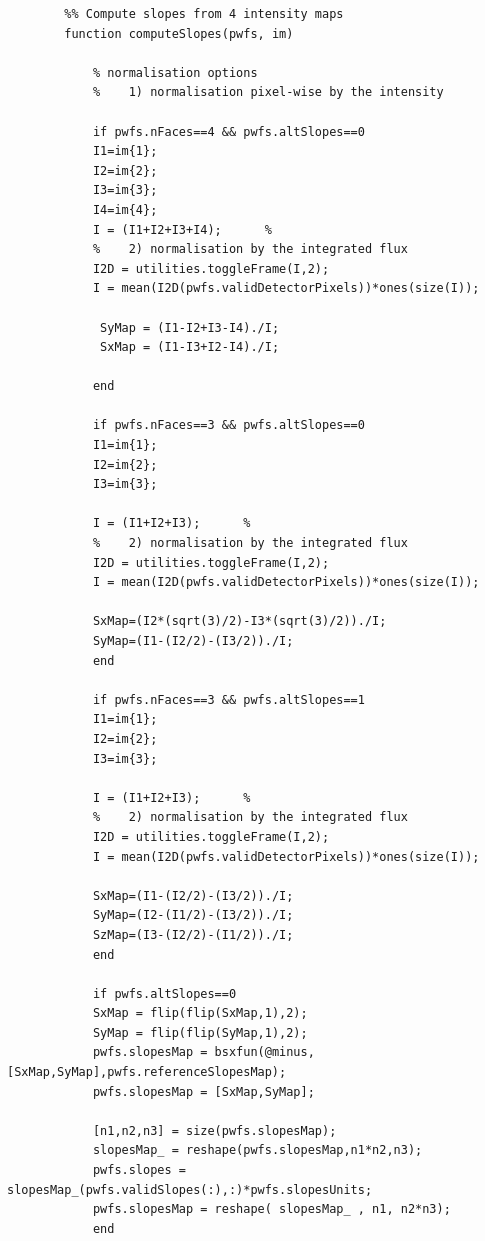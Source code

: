 \begin{lstlisting}
        %% Compute slopes from 4 intensity maps
        function computeSlopes(pwfs, im)
            
            % normalisation options
            %    1) normalisation pixel-wise by the intensity
            
            if pwfs.nFaces==4 && pwfs.altSlopes==0
            I1=im{1};
            I2=im{2};
            I3=im{3};
            I4=im{4};
            I = (I1+I2+I3+I4);      %         
            %    2) normalisation by the integrated flux
            I2D = utilities.toggleFrame(I,2);
            I = mean(I2D(pwfs.validDetectorPixels))*ones(size(I));
            
             SyMap = (I1-I2+I3-I4)./I;
             SxMap = (I1-I3+I2-I4)./I;
            
            end
            
            if pwfs.nFaces==3 && pwfs.altSlopes==0
            I1=im{1};
            I2=im{2};
            I3=im{3};
            
            I = (I1+I2+I3);      %         
            %    2) normalisation by the integrated flux
            I2D = utilities.toggleFrame(I,2);
            I = mean(I2D(pwfs.validDetectorPixels))*ones(size(I)); 
                
            SxMap=(I2*(sqrt(3)/2)-I3*(sqrt(3)/2))./I;
            SyMap=(I1-(I2/2)-(I3/2))./I; 
            end
             
            if pwfs.nFaces==3 && pwfs.altSlopes==1
            I1=im{1};
            I2=im{2};
            I3=im{3};
            
            I = (I1+I2+I3);      %         
            %    2) normalisation by the integrated flux
            I2D = utilities.toggleFrame(I,2);
            I = mean(I2D(pwfs.validDetectorPixels))*ones(size(I)); 
                
            SxMap=(I1-(I2/2)-(I3/2))./I;
            SyMap=(I2-(I1/2)-(I3/2))./I;
            SzMap=(I3-(I2/2)-(I1/2))./I;
            end
            
            if pwfs.altSlopes==0    
            SxMap = flip(flip(SxMap,1),2);
            SyMap = flip(flip(SyMap,1),2);
            pwfs.slopesMap = bsxfun(@minus,[SxMap,SyMap],pwfs.referenceSlopesMap);
            pwfs.slopesMap = [SxMap,SyMap];
            
            [n1,n2,n3] = size(pwfs.slopesMap);
            slopesMap_ = reshape(pwfs.slopesMap,n1*n2,n3);
            pwfs.slopes = slopesMap_(pwfs.validSlopes(:),:)*pwfs.slopesUnits;
            pwfs.slopesMap = reshape( slopesMap_ , n1, n2*n3);
            end
            

\end{lstlisting}
